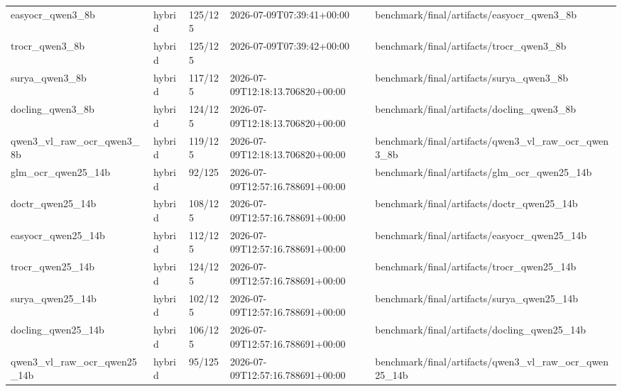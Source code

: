\begin{tabular}{lllll}
easyocr\_qwen3\_8b & hybrid & 125/125 & 2026-07-09T07:39:41+00:00 & benchmark/final/artifacts/easyocr\_qwen3\_8b \\
trocr\_qwen3\_8b & hybrid & 125/125 & 2026-07-09T07:39:42+00:00 & benchmark/final/artifacts/trocr\_qwen3\_8b \\
surya\_qwen3\_8b & hybrid & 117/125 & 2026-07-09T12:18:13.706820+00:00 & benchmark/final/artifacts/surya\_qwen3\_8b \\
docling\_qwen3\_8b & hybrid & 124/125 & 2026-07-09T12:18:13.706820+00:00 & benchmark/final/artifacts/docling\_qwen3\_8b \\
qwen3\_vl\_raw\_ocr\_qwen3\_8b & hybrid & 119/125 & 2026-07-09T12:18:13.706820+00:00 & benchmark/final/artifacts/qwen3\_vl\_raw\_ocr\_qwen3\_8b \\
glm\_ocr\_qwen25\_14b & hybrid & 92/125 & 2026-07-09T12:57:16.788691+00:00 & benchmark/final/artifacts/glm\_ocr\_qwen25\_14b \\
doctr\_qwen25\_14b & hybrid & 108/125 & 2026-07-09T12:57:16.788691+00:00 & benchmark/final/artifacts/doctr\_qwen25\_14b \\
easyocr\_qwen25\_14b & hybrid & 112/125 & 2026-07-09T12:57:16.788691+00:00 & benchmark/final/artifacts/easyocr\_qwen25\_14b \\
trocr\_qwen25\_14b & hybrid & 124/125 & 2026-07-09T12:57:16.788691+00:00 & benchmark/final/artifacts/trocr\_qwen25\_14b \\
surya\_qwen25\_14b & hybrid & 102/125 & 2026-07-09T12:57:16.788691+00:00 & benchmark/final/artifacts/surya\_qwen25\_14b \\
docling\_qwen25\_14b & hybrid & 106/125 & 2026-07-09T12:57:16.788691+00:00 & benchmark/final/artifacts/docling\_qwen25\_14b \\
qwen3\_vl\_raw\_ocr\_qwen25\_14b & hybrid & 95/125 & 2026-07-09T12:57:16.788691+00:00 & benchmark/final/artifacts/qwen3\_vl\_raw\_ocr\_qwen25\_14b \\
\bottomrule
\end{tabular}
